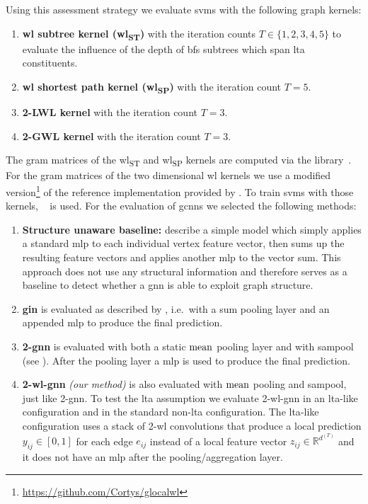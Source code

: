 Using this assessment strategy we evaluate \acp{svm} with the following graph kernels:
\begin{enumerate}[label={\textbf{\arabic*.}},itemsep=2pt,parsep=2pt]
	\item \textbf{\ac{wl} subtree kernel (\acs{wl}\textsubscript{ST})} with the iteration counts $T \in \{ 1,2,3,4,5 \}$ to evaluate the influence of the depth of \ac{bfs} subtrees which span \ac{lta} constituents.
	\item \textbf{\ac{wl} shortest path kernel (\acs{wl}\textsubscript{SP})} with the iteration count $T = 5$.
	\item \textbf{2-LWL kernel} with the iteration count $T = 3$.
	\item \textbf{2-GWL kernel} with the iteration count $T = 3$.
\end{enumerate}
The gram matrices of the \acs{wl}\textsubscript{ST} and \acs{wl}\textsubscript{SP} kernels are computed via the  library~\cite{Siglidis2018}\cite{GK}.
For the gram matrices of the two dimensional \ac{wl} kernels we use a modified version\footnote{\url{https://github.com/Cortys/glocalwl}} of the reference implementation provided by \citet{Morris2017}.
To train \acp{svm} with those kernels, ~\cite{Pedregosa2011}\cite{SKL} is used.
For the evaluation of \acp{gcnn} we selected the following methods:
\begin{enumerate}[label={\textbf{\arabic*.}},itemsep=2pt,parsep=2pt]
	\item \textbf{Structure unaware baseline:}
		\citet{Errica2020} describe a simple model which simply applies a standard \ac{mlp} to each individual vertex feature vector, then sums up the resulting feature vectors and applies another \ac{mlp} to the vector sum.
		This approach does not use any structural information and therefore serves as a baseline to detect whether a \ac{gnn} is able to exploit graph structure.
	\item \textbf{\ac{gin}} is evaluated as described by \citet{Xu2018}, i.e.\ with a sum pooling layer and an appended \ac{mlp} to produce the final prediction.
	\item \textbf{2-\acs{gnn}} is evaluated with both a static $\operatorname{mean}$ pooling layer and with \ac{sampool} (see ).
		After the pooling layer a \ac{mlp} is used to produce the final prediction.
	\item \textbf{2-\acs{wl}-\ac{gnn}} \textit{(our method)} is also evaluated with $\operatorname{mean}$ pooling and \ac{sampool}, just like 2-\ac{gnn}.
		To test the \ac{lta} assumption we evaluate 2-\acs{wl}-\acs{gnn} in an \acs{lta}-like configuration and in the standard non-\acs{lta} configuration.
		The \acs{lta}-like configuration uses a stack of 2-\acs{wl} convolutions that produce a local prediction $y_{ij} \in [0, 1]$ for each edge $e_{ij}$ instead of a local feature vector $z_{ij} \in \mathbb{R}^{d^{(T)}}$ and it does not have an \ac{mlp} after the pooling/aggregation layer.
\end{enumerate}
